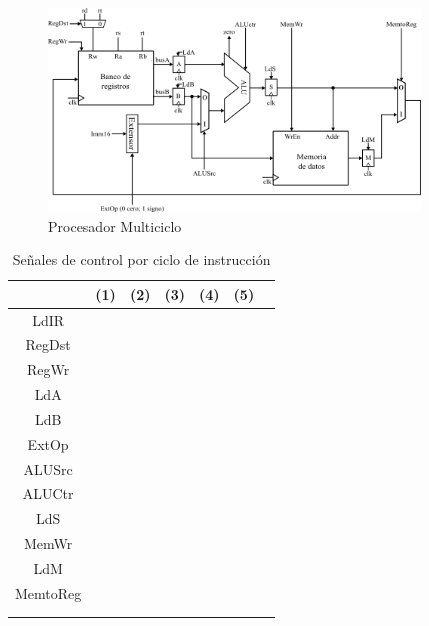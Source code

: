 \documentclass[letterpaper,11pt,notitlepage]{article}
\begin{document}
\newpage

\begin{figure}[H]
\begin{center}
\includegraphics[width=0.88\textwidth,keepaspectratio=true]{proc}
\end{center}
\caption{Procesador Multiciclo}
\end{figure}


\begin{table}[H]
\begin{center}
\begin{tabular}{|c|c|c|c|c|c|c|} \hline
        &(1)&(2)&(3)&(4)&(5) \\ \hline
LdIR    &  &  &  &  &    \\ \hline
RegDst  &  &  &  &  &    \\ \hline
RegWr   &  &  &  &  &    \\ \hline
LdA     &  &  &  &  &    \\ \hline
LdB     &  &  &  &  &    \\ \hline
ExtOp   &  &  &  &  &    \\ \hline
ALUSrc  &  &  &  &  &    \\ \hline
ALUCtr  &  &  &  &  &    \\ \hline
LdS     &  &  &  &  &    \\ \hline
MemWr   &  &  &  &  &    \\ \hline
LdM     &  &  &  &  &    \\ \hline
MemtoReg&  &  &  &  &    \\ \hline
    &  &  &  &  &    \\ \hline
    &  &  &  &  &    \\ \hline

\end{tabular}
\end{center}
\caption{Señales de control por ciclo de instrucción}
\end{table}
\end{document}
